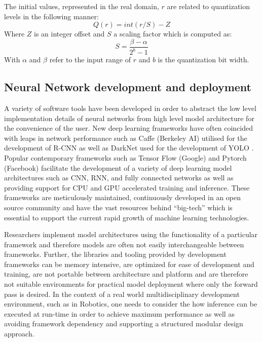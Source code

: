 \documentclass[a4paper,twoside,12pt]{report}
\begin{document}
The initial values, represented in the real domain, $r$ are related to quantization levels in the following manner:
\begin{equation}
Q(r) = int(r/S) - Z
\end{equation}
Where $Z$ is an integer offset and $S$ a scaling factor which is computed as:
\begin{equation}
S = \frac{\beta-\alpha}{2^b-1}
\end{equation}
With $\alpha$ and $\beta$ refer to the input range of $r$ and $b$ is the quantization bit width.

\subsection{Neural Network development and deployment}

A variety of software tools have been developed in order to abstract the low level implementation details of neural networks from high level model architecture for the convenience of the user. New deep learning frameworks have often coincided with leaps in network performance such as Caffe (Berkeley AI) \citep{caffe} utilised for the development of R-CNN \citep{rcnn} as well as DarkNet used for the development of YOLO \citep{yolo}. Popular contemporary frameworks such as Tensor Flow (Google) \citep{tensorflow} and Pytorch (Facebook) \citep{pytorch} facilitate the development of a variety of deep learning model architectures such as CNN, RNN, and fully connected networks as well as providing support for CPU and GPU accelerated training and inference. These frameworks are meticulously maintained, continuously developed in an open source community and have the vast resources behind ``big-tech'' which is essential to support the current rapid growth of machine learning technologies.

Researchers implement model architectures using the functionality of a particular framework and therefore models are often not easily interchangeable between frameworks. Further, the libraries and tooling provided by development frameworks can be memory intensive, are optimized for ease of development and training, are not portable between  architecture and platform and are therefore not suitable environments for practical model deployment where only the forward pass is desired. In the context of a real world multidisciplinary development environment, such as in Robotics, one needs to consider the how inference can be executed at run-time in order to achieve maximum performance as well as avoiding framework dependency and supporting a structured modular design approach. 
\end{document}

